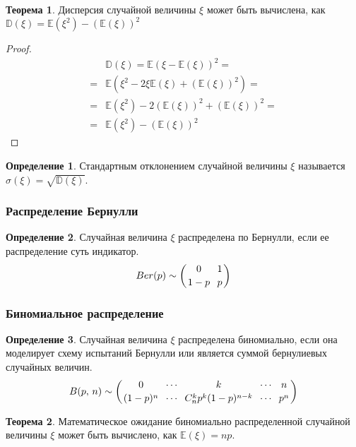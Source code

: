 \documentclass[12pt]{article}
\theoremstyle{definition}
\newtheorem{theorem}{Теорема}[section]
\newtheorem{definition}{Определение}
\newcommand{\E}{\mathbb{E}}
\newcommand{\D}{\mathbb{D}}
\begin{document}
\begin{theorem}
    Дисперсия случайной величины $\xi$ может быть вычислена, как $\D(\xi)=\E(\xi^2)-(\E(\xi))^2$
\end{theorem}

\begin{proof}
    \begin{align*}
        &\D(\xi)=\E(\xi-\E(\xi))^2=\\
        =&\E(\xi^2-2\xi\E(\xi)+(\E(\xi))^2)=\\
        =&\E(\xi^2)-2(\E(\xi))^2+(\E(\xi))^2=\\
        =&\E(\xi^2)-(\E(\xi))^2
    \end{align*}
\end{proof}

\begin{definition}
    Стандартным отклонением случайной величины $\xi$ называется $\sigma(\xi)=\sqrt{\D(\xi)}$.
\end{definition}

    \subsubsection{Распределение Бернулли}

\begin{definition}
    Случайная величина $\xi$  распределена по Бернулли, если ее распределение суть индикатор.
    $$Ber(p)\sim \left(\genfrac{}{}{0pt}{0}{0}{1-p} \,\,\, \genfrac{}{}{0pt}{0}{1}{p} \right)$$
\end{definition}

    \subsubsection{Биномиальное распределение}

\begin{definition}
    Случайная величина $\xi$ распределена биномиально, если она моделирует схему испытаний  Бернулли или является суммой бернулиевых случайных величин.
    $$B(p,\,n)\sim \left( \genfrac{}{}{0pt}{0}{0}{(1-p)^n} \,\,\, \genfrac{}{}{0pt}{0}{\cdots}{\cdots} \,\,\, \genfrac{}{}{0pt}{0}{k}{C_n^kp^k(1-p)^{n-k}} \,\,\, \genfrac{}{}{0pt}{0}{\cdots}{\cdots} \,\,\, \genfrac{}{}{0pt}{0}{n}{p^n} \right)$$
\end{definition}

\begin{theorem}
    Математическое ожидание биномиально распределенной случайной величины $\xi$ может быть вычислено, как $\E(\xi)=np$.
\end{theorem}
\end{document}
